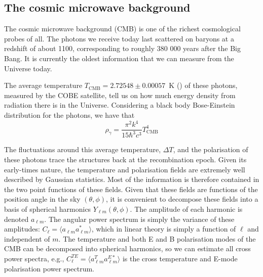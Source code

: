     \subsection{The cosmic microwave background}
    \label{intro:probes:cmb}

    The cosmic microwave background (CMB) is one of the richest cosmological probes of all. 
    The photons we receive today last scattered on baryons at a redshift of about 1100,
    corresponding to roughly 380 000 years after the Big Bang. 
    It is currently the oldest information that we can measure from the Universe today. 
    
    The average temperature $T_\mathrm{CMB} = 2.72548 \pm 0.00057$~K 
    (\cite{matherMeasurementCosmicMicrowave1994, fixsenTemperatureCosmicMicrowave2009}) 
    of these photons, measured by the COBE satellite, tell us on how much 
    energy density from radiation there is in the Universe. 
    Considering a black body Bose-Einstein distribution for the photons, we have that 
    \begin{equation}
        \rho_\gamma = \frac{\pi^2 k^4}{15 \hbar^3 c^3} T_\mathrm{CMB}^4
        \label{eq:energy_density_photons}
    \end{equation} 
    
    The fluctuations around this average temperature, $\Delta T$, 
    and the polarisation of these photons
    trace the structures back at the recombination epoch. 
    Given its early-times nature, 
    the temperature and polarisation fields are extremely well described by 
    Gaussian statistics. Most of the information is therefore contained in the two point
    functions of these fields. Given that these fields are functions of
    the position angle in the sky $(\theta, \phi)$, it is convenient to decompose these 
    fields into a basis of spherical harmonics $Y_{\ell m}(\theta, \phi)$.
    The amplitude of each harmonic is denoted $a_{\ell m}$. The angular power spectrum  
    is simply the variance of these amplitudes: $C_\ell = \langle a_{\ell m} a^*_{\ell m}\rangle$, 
    which in linear theory is simply a function of $\ell$ and independent of $m$. 
    The temperature and both E and B polarisation modes of the CMB can be decomposed into 
    spherical harmonics, so we can estimate all cross power spectra, e.g., 
    $C^{TE}_\ell = \langle a^T_{\ell m} a^{E*}_{\ell m}\rangle$ is the
    cross temperature and E-mode polarisation power spectrum. 
    
